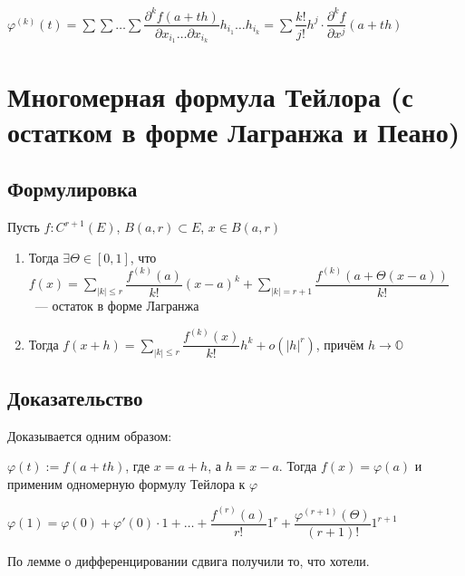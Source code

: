 \documentclass{article}
\begin{document}
            $\varphi^{(k)}(t) = \sum \sum \ldots \sum \dfrac{\partial^k f(a + th)}{\partial x_{i_1} \ldots \partial x_{i_k}} h_{i_1} \ldots h_{i_k} = \sum \dfrac{k!}{j!} h^j \cdot \dfrac{\partial^k f}{\partial x^j} (a + th)$
            
    \newpage
    
    \section{Многомерная формула Тейлора (с остатком в форме Лагранжа и Пеано)}
    
        \subsection{Формулировка}
        
            Пусть $f : C^{r + 1} (E)$, $B(a, r) \subset E$, $x \in B(a, r)$
            
            \begin{enumerate}
            
                \item Тогда $\exists \Theta \in [0, 1]$, что $f(x) = \sum\limits_{|k| \leq r} \dfrac{f^{(k)}(a)}{k!} (x - a)^k + \sum\limits_{|k| = r + 1} \dfrac{f^{(k)}(a + \Theta (x - a))}{k!}$ ~--- остаток в форме Лагранжа
            
                \item Тогда $f(x + h) = \sum\limits_{|k| \leq r} \dfrac{f^{(k)}(x)}{k!} h^k + o(|h|^r)$, причём $h \rightarrow \mathbb{O}$
                
            \end{enumerate}
            
        \subsection{Доказательство}
        
            Доказывается одним образом:
            
            $\varphi(t) := f(a + th)$, где $x = a + h$, а $h = x - a$. Тогда $f(x) = \varphi(a)$ и применим одномерную формулу Тейлора к $\varphi$
            
            $\varphi(1) = \varphi(0) + \varphi'(0) \cdot 1 + \ldots + \dfrac{f^{(r)}(a)}{r!}1^r + \dfrac{\varphi^{(r + 1)} (\Theta)}{(r + 1)!}1^{r + 1}$
            
            По лемме о дифференцировании сдвига получили то, что хотели.
            
\end{document}
